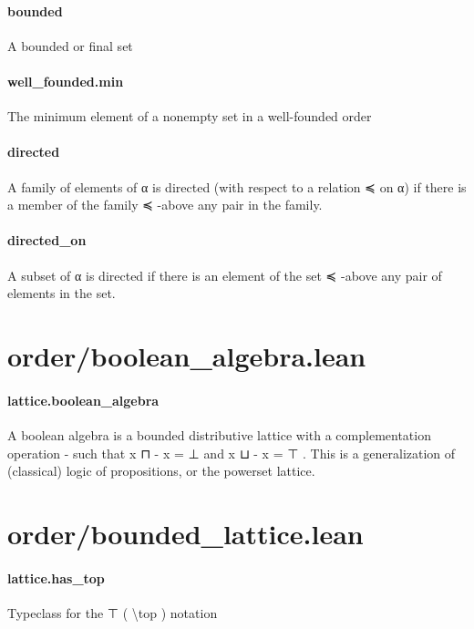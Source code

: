 \documentclass{article}
\begin{document}
\paragraph{bounded}
\par
A bounded or final set
\paragraph{well\_founded.min}
\par
The minimum element of a nonempty set in a well-founded order
\paragraph{directed}
\par
A family of elements of α is directed (with respect to a relation 
\colorbox[RGB]{253,246,227}{{{{\color[RGB]{101, 123, 131} ≼ }}}} on α)
if there is a member of the family 
\colorbox[RGB]{253,246,227}{{{{\color[RGB]{101, 123, 131} ≼ }}}}-above any pair in the family.
\paragraph{directed\_on}
\par
A subset of α is directed if there is an element of the set 
\colorbox[RGB]{253,246,227}{{{{\color[RGB]{101, 123, 131} ≼ }}}}-above any
pair of elements in the set.
\section{order/boolean\_algebra.lean}\paragraph{lattice.boolean\_algebra}
\par
A boolean algebra is a bounded distributive lattice with a
complementation operation 
\colorbox[RGB]{253,246,227}{{{{\color[RGB]{181, 137, 0} - }}}} such that 
\colorbox[RGB]{253,246,227}{{{{\color[RGB]{101, 123, 131} x ⊓  }}}{{{\color[RGB]{181, 137, 0} - }}}{{{\color[RGB]{101, 123, 131}  x  }}}{{{\color[RGB]{181, 137, 0} = }}}{{{\color[RGB]{101, 123, 131}  ⊥ }}}} and 
\colorbox[RGB]{253,246,227}{{{{\color[RGB]{101, 123, 131} x ⊔  }}}{{{\color[RGB]{181, 137, 0} - }}}{{{\color[RGB]{101, 123, 131}  x  }}}{{{\color[RGB]{181, 137, 0} = }}}{{{\color[RGB]{101, 123, 131}  ⊤ }}}}.
This is a generalization of (classical) logic of propositions, or
the powerset lattice.
\section{order/bounded\_lattice.lean}\paragraph{lattice.has\_top}
\par
Typeclass for the 
\colorbox[RGB]{253,246,227}{{{{\color[RGB]{101, 123, 131} ⊤ }}}} (
\colorbox[RGB]{253,246,227}{{{{\color[RGB]{101, 123, 131} \textbackslash{}top }}}}) notation
\end{document}
